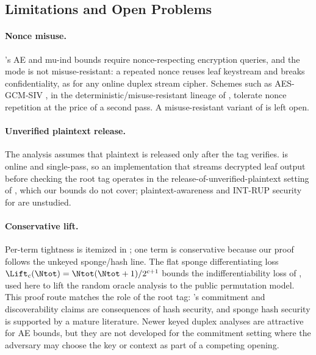 \subsection{Limitations and Open Problems}
\label{sec:limitations}

\paragraph{Nonce misuse.}
\TW{}'s AE and mu-ind bounds require nonce-respecting encryption queries, and the mode is
not misuse-resistant: a repeated nonce reuses leaf keystream and breaks
confidentiality, as for any online duplex stream cipher. Schemes such as
AES-GCM-SIV \cite{GLL17}, in the deterministic/misuse-resistant lineage of
\cite{RS06}, tolerate nonce repetition at the price of a second pass. A
misuse-resistant variant of \TW{} is left open.

\paragraph{Unverified plaintext release.}
The analysis assumes that plaintext is released only after the tag verifies. \TW{}
is online and single-pass, so an implementation that streams decrypted leaf
output before checking the root tag operates in the release-of-unverified-plaintext
setting of \cite{ABLMMY14}, which our bounds do not cover; plaintext-awareness and
\textsf{INT-RUP} security for \TW{} are unstudied.

\paragraph{Conservative lift.}
Per-term tightness is itemized in ; one term is
conservative because our proof follows the unkeyed sponge/hash line. The flat
sponge differentiating loss
$\Lift_c(\Ntot) = \Ntot(\Ntot+1)/2^{c+1}$ bounds the indifferentiability
loss of \cite{BDPV08}, used here to lift the random oracle analysis to the
public permutation model. This proof route matches the role of the root tag:
\TW{}'s commitment and discoverability claims are consequences of hash security,
and sponge hash security is supported by a mature literature. Newer keyed duplex
analyses are attractive for AE bounds, but they are not developed for the
commitment setting where the adversary may choose the key or context as part of a
competing opening.

